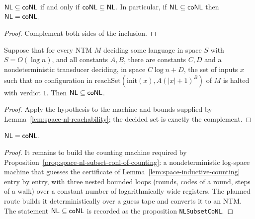 \begin{proposition}
  \label{prop:space-nl-conl-symmetric}
  \leanok
  $\mathsf{NL} \subseteq \mathsf{coNL}$ if and only if $\mathsf{coNL} \subseteq \mathsf{NL}$.
  In particular, if $\mathsf{NL} \subseteq \mathsf{coNL}$ then $\mathsf{NL} = \mathsf{coNL}$.
\end{proposition}
\begin{proof}
  \leanok
  Complement both sides of the inclusion.
\end{proof}

\begin{proposition}
  \label{prop:space-nl-subset-conl-of-counting}
  \leanok
  Suppose that for every NTM $M$ deciding some language in space $S$ with
  $S = O(\log n)$, and all constants $A, B$, there are constants $C, D$ and a
  nondeterministic transducer deciding, in space $C \log n + D$, the set of
  inputs $x$ such that no configuration in
  $\mathrm{reachSet}(\mathrm{init}(x), A(|x| + 1)^B)$ of $M$ is halted with
  verdict $1$. Then $\mathsf{NL} \subseteq \mathsf{coNL}$.
\end{proposition}
\begin{proof}
  \leanok
  Apply the hypothesis to the machine and bounds supplied by
  Lemma~\ref{lem:space-nl-reachability}; the decided set is exactly the
  complement.
\end{proof}

\begin{theorem}
  \label{thm:space-immerman}
  $\mathsf{NL} = \mathsf{coNL}$.
\end{theorem}
\begin{proof}
  It remains to build the counting machine required by
  Proposition~\ref{prop:space-nl-subset-conl-of-counting}: a nondeterministic
  log-space machine that guesses the certificate of
  Lemma~\ref{lem:space-inductive-counting} entry by entry, with three nested
  bounded loops (rounds, codes of a round, steps of a walk) over a constant
  number of logarithmically wide registers. The planned route builds it
  deterministically over a guess tape and converts it to an NTM. The
  statement $\mathsf{NL} \subseteq \mathsf{coNL}$ is recorded as the proposition
  \texttt{NLSubsetCoNL}.
\end{proof}

